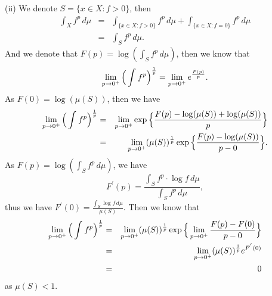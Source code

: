 \documentclass[12pt,a4paper]{ctexart}
\begin{document}
(ii) We denote $S = \{x \in X: f > 0\}$, then
\begin{eqnarray*}
    \int_{X}^{} f^{p} \, d \mu & = & \int_{\{x \in X: f > 0\}}^{} f^{p} \, d \mu + \int_{\{x \in X: f = 0\}}^{} f^{p} \, d \mu \\
    & = & \int_{S}^{} f^{p} \, d \mu.
\end{eqnarray*}
And we denote that $F(p) = \log (\int_{S}^{} f^{p} \, d \mu)$, then we know that
\begin{equation*}
    \lim_{p \to 0^{+}} \Big{(} \int_{}^{} f^{p} \Big{)}^{\frac{1}{p}} = \lim_{p \to 0^{+}} e^{\frac{F(p)}{p}}.
\end{equation*}
As $F(0) = \log(\mu(S))$, then we have
\begin{eqnarray*}
    \lim_{p \to 0^{+}} \Big{(} \int_{}^{} f^{p} \Big{)}^{\frac{1}{p}} & = & \lim_{p \to 0^{+}} \exp \Big{\{} \frac{F(p) - \log(\mu(S)) + \log(\mu(S))}{p} \Big{\}} \\
    & = & \lim_{p \to 0^{+}} (\mu(S))^{\frac{1}{p}} \exp \Big{\{} \frac{F(p) - \log(\mu(S))}{p - 0} \Big{\}}.
\end{eqnarray*}
As $F(p) = \log (\int_{S}^{} f^{p} \, d \mu)$, we have 
\begin{equation*}
    F^{'}(p) = \frac{\int_{S}^{} f^{p} \cdot \log f \, d \mu}{\int_{S}^{} f^{p} \, d \mu},
\end{equation*}
thus we have $F^{'}(0) = \frac{\int_{S}^{} \log f \, d \mu}{\mu(S)}$. Then we know that
\begin{eqnarray*}
    \lim_{p \to 0^{+}} \Big{(} \int_{}^{} f^{p} \Big{)}^{\frac{1}{p}} & = & \lim_{p \to 0^{+}} (\mu(S))^{\frac{1}{p}} \exp \Big{\{} \lim_{p \to 0^{+}} \frac{F(p) - F(0)}{p - 0} \Big{\}} \\
    & = & \lim_{p \to 0^{+}} (\mu(S))^{\frac{1}{p}} e^{F^{'}(0)} \\
    & = & 0
\end{eqnarray*}
as $\mu(S) < 1$.
\end{document}
